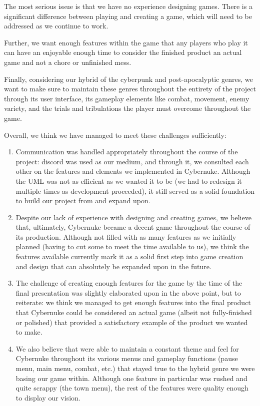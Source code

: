 \documentclass[10pt,conference,onecolumn,compsoc]{IEEEtran}
\begin{document}
The most serious issue is that we have no experience designing games. There is a significant difference between playing and creating a game, which will need to be addressed as we continue to work.

Further, we want enough features within the game that any players who play it can have an enjoyable enough time to consider the finished product an actual game and not a chore or unfinished mess.

Finally, considering our hybrid of the cyberpunk and post-apocalyptic genres, we want to make sure to maintain these genres throughout the entirety of the project through its user interface, its gameplay elements like combat, movement, enemy variety, and the trials and tribulations the player must overcome throughout the game.

Overall, we think we have managed to meet these challenges sufficiently:
\begin{enumerate}
\item Communication was handled appropriately throughout the course of the project: discord was used as our medium, and through it, we consulted each other on the features and elements we implemented in Cybernuke. Although the UML was not as efficient as we wanted it to be (we had to redesign it multiple times as development proceeded), it still served as a solid foundation to build our project from and expand upon.
\item Despite our lack of experience with designing and creating games, we believe that, ultimately, Cybernuke became a decent game throughout the course of its production. Although not filled with as many features as we initially planned (having to cut some to meet the time available to us), we think the features available currently mark it as a solid first step into game creation and design that can absolutely be expanded upon in the future.
\item The challenge of creating enough features for the game by the time of the final presentation was slightly elaborated upon in the above point, but to reiterate: we think we managed to get enough features into the final product that Cybernuke could be considered an actual game (albeit not fully-finished or polished) that provided a satisfactory example of the product we wanted to make.
\item We also believe that were able to maintain a constant theme and feel for Cybernuke throughout its various menus and gameplay functions (pause menu, main menu, combat, etc.) that stayed true to the hybrid genre we were basing our game within. Although one feature in particular was rushed and quite scrappy (the town menu), the rest of the features were quality enough to display our vision.
\end{enumerate}
\end{document}
